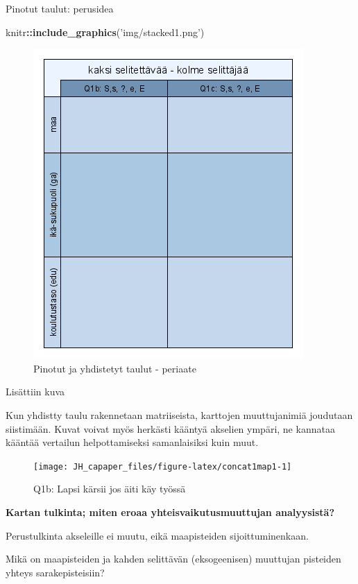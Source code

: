 \documentclass[
  finnish,
]{book}
\newenvironment{Shaded}{\begin{snugshade}}{\end{snugshade}}
\newcommand{\KeywordTok}[1]{\textcolor[rgb]{0.13,0.29,0.53}{\textbf{#1}}}
\newcommand{\NormalTok}[1]{#1}
\newcommand{\OperatorTok}[1]{\textcolor[rgb]{0.81,0.36,0.00}{\textbf{#1}}}
\newcommand{\StringTok}[1]{\textcolor[rgb]{0.31,0.60,0.02}{#1}}
\begin{document}
Pinotut taulut: perusidea

\begin{Shaded}
\begin{Highlighting}[]
\NormalTok{knitr}\OperatorTok{::}\KeywordTok{include_graphics}\NormalTok{(}\StringTok{'img/stacked1.png'}\NormalTok{)}
\end{Highlighting}
\end{Shaded}

\begin{figure}

{\centering \includegraphics[width=0.5\linewidth]{img/stacked1} 

}

\caption{Pinotut ja yhdistetyt taulut - periaate}\label{fig:stackedimg1}
\end{figure}

Lisättiin kuva

Kun yhdistty taulu rakennetaan matriiseista, karttojen muuttujanimiä
joudutaan siistimään. Kuvat voivat myös herkästi kääntyä akselien
ympäri, ne kannataa kääntää vertailun helpottamiseksi samanlaisiksi kuin
muut.

\begin{figure}

{\centering \texttt{[image: JH\_capaper\_files/figure-latex/concat1map1-1]} 

}

\caption{Q1b: Lapsi kärsii jos äiti käy työssä}\label{fig:concat1map1}
\end{figure}

\textbf{Kartan tulkinta; miten eroaa yhteisvaikutusmuuttujan
analyysistä?}

Perustulkinta akseleille ei muutu, eikä maapisteiden sijoittuminenkaan.

Mikä on maapisteiden ja kahden selittävän (eksogeenisen) muuttujan
pisteiden yhteys sarakepisteisiin?
\end{document}
